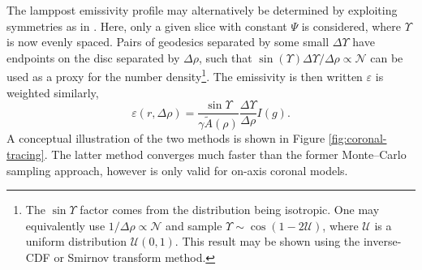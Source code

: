 \documentclass[fleqn,usenatbib]{mnras}
\begin{document}
The lamppost emissivity profile may alternatively be determined by exploiting
symmetries as in \cite{dauser_irradiation_2013}.  Here, only a given slice with
constant $\Psi$ is considered, where $\Upsilon$ is now evenly spaced. Pairs of
geodesics separated by some small $\Delta \Upsilon$ have endpoints on the disc
separated by $\Delta \rho$, such that $\sin (\Upsilon) \Delta \Upsilon / \Delta
\rho \propto \mathcal{N}$ can be used as a proxy for the number
density\footnote{The $\sin \Upsilon$ factor comes from the distribution being
    isotropic. One may equivalently use $1/\Delta \rho \propto \mathcal{N}$ and
    sample $\Upsilon \sim \cos (1 - 2 \mathcal{U})$, where $\mathcal{U}$ is a
    uniform distribution $\mathcal{U}(0,1)$. This result may be shown using the
inverse-CDF or Smirnov transform method.}. The emissivity is then written
$\varepsilon$ is weighted similarly,
\begin{equation}
    \varepsilon(r, \Delta \rho) = \frac{\sin \Upsilon}{\gamma \tilde{A}(\rho)}
    \frac{\Delta \Upsilon}{\Delta \rho} I(g).
\end{equation}
A conceptual illustration of the two methods is shown in Figure
\ref{fig:coronal-tracing}. The latter method converges much faster than the
former Monte--Carlo sampling approach, however is only valid for on-axis coronal
models.
\end{document}
